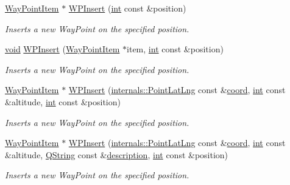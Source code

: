 \begin{DoxyCompactItemize}
\hyperlink{classmapcontrol_1_1_way_point_item}{Way\-Point\-Item} $\ast$ \hyperlink{group___o_p_map_widget_ga44d46fc77045a7ac6011ebda19204c43}{W\-P\-Insert} (\hyperlink{ioapi_8h_a787fa3cf048117ba7123753c1e74fcd6}{int} const \&position)
\begin{DoxyCompactList}\small\item\em Inserts a new Way\-Point on the specified position. \end{DoxyCompactList}\item 
\hyperlink{group___u_a_v_objects_plugin_ga444cf2ff3f0ecbe028adce838d373f5c}{void} \hyperlink{group___o_p_map_widget_ga65a6a571d08fec807a20945e293acc73}{W\-P\-Insert} (\hyperlink{classmapcontrol_1_1_way_point_item}{Way\-Point\-Item} $\ast$item, \hyperlink{ioapi_8h_a787fa3cf048117ba7123753c1e74fcd6}{int} const \&position)
\begin{DoxyCompactList}\small\item\em Inserts a new Way\-Point on the specified position. \end{DoxyCompactList}\item 
\hyperlink{classmapcontrol_1_1_way_point_item}{Way\-Point\-Item} $\ast$ \hyperlink{group___o_p_map_widget_ga1b5b37540dd272a7b6f4a39ae12095a4}{W\-P\-Insert} (\hyperlink{structinternals_1_1_point_lat_lng}{internals\-::\-Point\-Lat\-Lng} const \&\hyperlink{glext_8h_a4ad6f000813afde2b5727cbfdddc75be}{coord}, \hyperlink{ioapi_8h_a787fa3cf048117ba7123753c1e74fcd6}{int} const \&altitude, \hyperlink{ioapi_8h_a787fa3cf048117ba7123753c1e74fcd6}{int} const \&position)
\begin{DoxyCompactList}\small\item\em Inserts a new Way\-Point on the specified position. \end{DoxyCompactList}\item 
\hyperlink{classmapcontrol_1_1_way_point_item}{Way\-Point\-Item} $\ast$ \hyperlink{group___o_p_map_widget_ga344e39ad3db8c1de32dda8273e78310e}{W\-P\-Insert} (\hyperlink{structinternals_1_1_point_lat_lng}{internals\-::\-Point\-Lat\-Lng} const \&\hyperlink{glext_8h_a4ad6f000813afde2b5727cbfdddc75be}{coord}, \hyperlink{ioapi_8h_a787fa3cf048117ba7123753c1e74fcd6}{int} const \&altitude, \hyperlink{group___u_a_v_objects_plugin_gab9d252f49c333c94a72f97ce3105a32d}{Q\-String} const \&\hyperlink{sdlgamepad_8dox_ae82208d022e4246ddf1e4f481a3f81b0}{description}, \hyperlink{ioapi_8h_a787fa3cf048117ba7123753c1e74fcd6}{int} const \&position)
\begin{DoxyCompactList}\small\item\em Inserts a new Way\-Point on the specified position. \end{DoxyCompactList}\item 

\end{DoxyCompactItemize}
